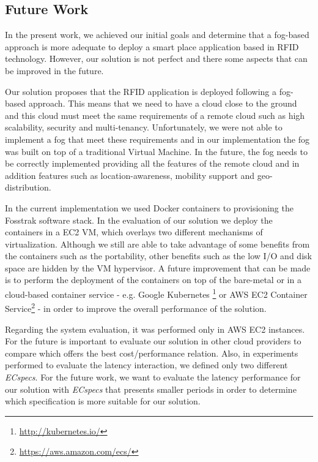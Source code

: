 \subsection{Future Work}
\label{sub:future_work}
In the present work, we achieved our initial goals and determine that a fog-based approach is more
adequate to deploy a smart place application based in \gls{RFID} technology. However, our solution
is not perfect and there some aspects that can be improved in the future.

Our solution proposes that the \gls{RFID} application is deployed following a fog-based approach.
This means that we need to have a cloud close to the ground and this cloud must meet the same
requirements of a remote cloud such as high scalability, security and multi-tenancy. Unfortunately,
we were not able to implement a fog that meet these requirements and in our implementation the fog
was built on top of a traditional Virtual Machine. In the future, the fog needs to be correctly
implemented providing all the features of the remote cloud and in addition features such as
location-awareness, mobility support and geo-distribution.

In the current implementation we used Docker containers to provisioning the Fosstrak software stack.
In the evaluation of our solution we deploy the containers in a \gls{EC2} \gls{VM}, which overlays two
different mechanisms of virtualization. Although we still are able to take advantage of some benefits
from the containers such as the portability, other benefits such as the low I/O and disk space are
hidden by the \gls{VM} hypervisor. A future improvement that can be made is to perform the deployment
of the containers on top of the bare-metal or in a cloud-based container service - e.g. Google Kubernetes
\footnote{\url{http://kubernetes.io/}} or \gls{AWS} \gls{EC2} Container Service\footnote{\url{https://aws.amazon.com/ecs/}} -
in order to improve the overall performance of the solution.

Regarding the system evaluation, it was performed only in \gls{AWS} \gls{EC2} instances. For the future
is important to evaluate our solution in other cloud providers to compare which offers the best cost/performance
relation. Also, in experiments performed to evaluate the latency interaction, we defined only two
different \textit{ECspecs}. For the future work, we want to evaluate the latency performance for
our solution with \textit{ECspecs} that presents smaller periods in order to determine which
specification is more suitable for our solution.

